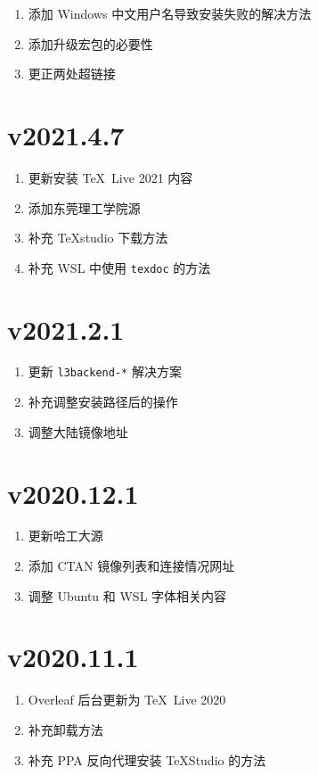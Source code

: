 \begin{enumerate}
  \item 添加 Windows 中文用户名导致安装失败的解决方法
  \item 添加升级宏包的必要性
  \item 更正两处超链接
\end{enumerate}

\section*{v2021.4.7}

\begin{enumerate}
  \item 更新安装 \TeX\ Live 2021 内容
  \item 添加东莞理工学院源
  \item 补充 \TeX studio 下载方法
  \item 补充 WSL 中使用 \texttt{texdoc} 的方法
\end{enumerate}

\section*{v2021.2.1}

\begin{enumerate}
  \item 更新 \texttt{l3backend-*} 解决方案
  \item 补充调整安装路径后的操作
  \item 调整大陆镜像地址
\end{enumerate}
\section*{v2020.12.1}

\begin{enumerate}
  \item 更新哈工大源
  \item 添加 CTAN 镜像列表和连接情况网址
  \item 调整 Ubuntu 和 WSL 字体相关内容
\end{enumerate}

\section*{v2020.11.1}

\begin{enumerate}
  \item Overleaf 后台更新为 \TeX\ Live 2020
  \item 补充卸载方法
  \item 补充 PPA 反向代理安装 \TeX Studio 的方法
\end{enumerate}

